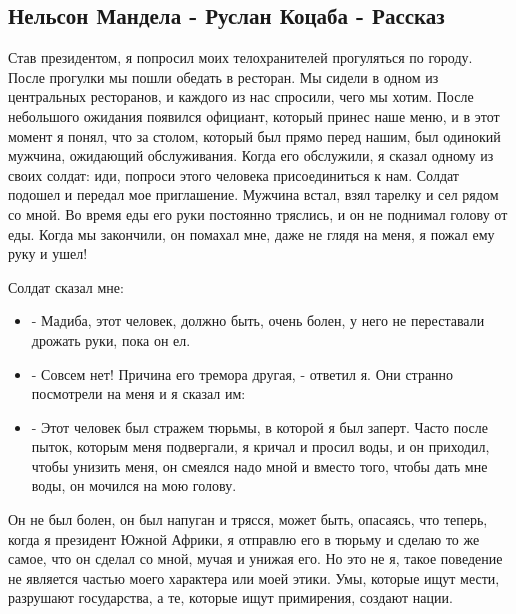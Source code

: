  
 
 

\subsection{Нельсон Мандела - Руслан Коцаба - Рассказ}
\label{sec:08_11_2020.fb.ukrpacificus.1.nelson_mandela}


Став президентом, я попросил моих телохранителей прогуляться по городу. После
прогулки мы пошли обедать в ресторан. Мы сидели в одном из центральных
ресторанов, и каждого из нас спросили, чего мы хотим. После небольшого ожидания
появился официант, который принес наше меню, и в этот момент я понял, что за
столом, который был прямо перед нашим, был одинокий мужчина, ожидающий
обслуживания. Когда его обслужили, я сказал одному из своих солдат: иди,
попроси этого человека присоединиться к нам. Солдат подошел и передал мое
приглашение. Мужчина встал, взял тарелку и сел рядом со мной. Во время еды его
руки постоянно тряслись, и он не поднимал голову от еды. Когда мы закончили, он
помахал мне, даже не глядя на меня, я пожал ему руку и ушел!

Солдат сказал мне:

\begin{itemize}
\item - Мадиба, этот человек, должно быть, очень болен, у него не переставали дрожать руки, пока он ел.
\item - Совсем нет! Причина его тремора другая, - ответил я. Они странно
				посмотрели на меня и я сказал им:
\item - Этот человек был стражем тюрьмы, в которой я был заперт. Часто после
				пыток, которым меня подвергали, я кричал и просил воды, и он приходил,
				чтобы унизить меня, он смеялся надо мной и вместо того, чтобы дать мне
				воды, он мочился на мою голову.
\end{itemize}

Он не был болен, он был напуган и трясся, может быть, опасаясь, что теперь,
когда я президент Южной Африки, я отправлю его в тюрьму и сделаю то же самое,
что он сделал со мной, мучая и унижая его. Но это не я, такое поведение не
является частью моего характера или моей этики. Умы, которые ищут мести,
разрушают государства, а те, которые ищут примирения, создают нации.

